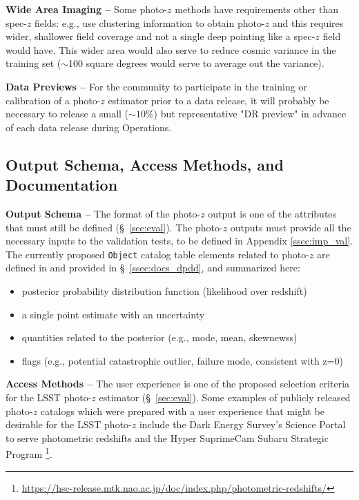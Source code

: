 \documentclass[DM,lsstdraft,toc]{lsstdoc}
\begin{document}
{\bf Wide Area Imaging --} 
Some photo-$z$ methods have requirements other than spec-$z$ fields: e.g., \citet{2019MNRAS.483.2801S} use clustering information to obtain photo-$z$ and this requires wider, shallower field coverage and not a single deep pointing like a spec-$z$ field would have. 
This wider area would also serve to reduce cosmic variance in the training set ($\sim$100 square degrees would serve to average out the variance).

{\bf Data Previews --}
For the community to participate in the training or calibration of a photo-$z$ estimator prior to a data release, it will probably be necessary to release a small ($\sim10\%$) but representative "DR preview" in advance of each data release during Operations.

\subsection{Output Schema, Access Methods, and Documentation}\label{ssec:dp_pz}

{\bf Output Schema --} 
The format of the photo-$z$ output is one of the attributes that must still be defined (\S~\ref{sec:eval}). 
The photo-$z$ outputs must provide all the necessary inputs to the validation tests, to be defined in Appendix \ref{ssec:imp_val}.
The currently proposed {\tt Object} catalog table elements related to photo-$z$ are defined in  and provided in \S~\ref{ssec:docs_dpdd}, and summarized here:
\vspace{-15pt}
\begin{itemize}
\item posterior probability distribution function (likelihood over redshift)
\item a single point estimate with an uncertainty
\item quantities related to the posterior (e.g., mode, mean, skewnewss)
\item flags (e.g., potential catastrophic outlier, failure mode, consistent with z=0)
\end{itemize}

{\bf Access Methods --} 
The user experience is one of the proposed selection criteria for the LSST photo-$z$ estimator (\S~\ref{sec:eval}). 
Some examples of publicly released photo-$z$ catalogs which were prepared with a user experience that might be desirable for the LSST photo-$z$ include the Dark Energy Survey's Science Portal to serve photometric redshifts \cite{2018A&C....25...58G} and the Hyper SuprimeCam Subaru Strategic Program \cite{2018PASJ...70S...9T}\footnote{\url{https://hsc-release.mtk.nao.ac.jp/doc/index.php/photometric-redshifts/}}.
\end{document}
